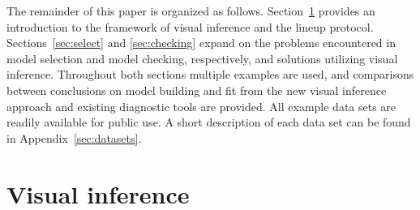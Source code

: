 \documentclass[12pt]{article} %
\newcommand{\alnote}[1]{\todo[inline,color=green!40]{#1}} %
\newcommand{\hhnote}[1]{\todo[inline,color=orange!40]{#1}}
\begin{document}
The remainder of this paper is organized as follows. 
Section~\ref{sec:vi} provides an introduction to the framework of visual inference and the lineup protocol. Sections~\ref{sec:select} and \ref{sec:checking} expand on the problems encountered in model selection and model checking, respectively, and solutions utilizing visual inference. 
Throughout both sections multiple examples are used, and comparisons between conclusions on model building and fit from the new visual inference approach and existing diagnostic tools are provided. All example data sets are readily available for public use. A short description of each data set can be found in Appendix~\ref{sec:datasets}.






\section{Visual inference}\label{sec:vi}
\end{document}
